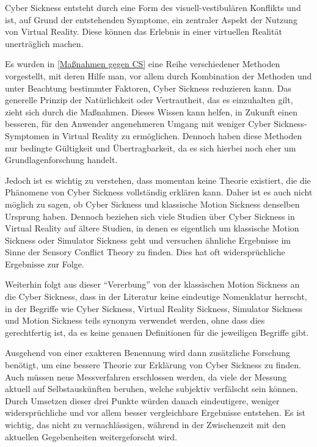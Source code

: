 Cyber Sickness entsteht durch eine Form des visuell-vestibul\"aren Konflikts und ist, auf Grund der entstehenden Symptome, ein zentraler Aspekt der Nutzung von Virtual Reality. Diese k\"onnen das Erlebnis in einer virtuellen Realit\"at unertr\"aglich machen.

Es wurden in \autoref{Maßnahmen gegen CS} eine Reihe verschiedener Methoden vorgestellt, mit deren Hilfe man, vor allem durch Kombination der Methoden und unter Beachtung bestimmter Faktoren, Cyber Sickness reduzieren kann. Das generelle Prinzip der Nat\"urlichkeit oder Vertrautheit, das es einzuhalten gilt, zieht sich durch die Ma{\ss}nahmen.
Dieses Wissen kann helfen, in Zukunft einen besseren, f\"ur den Anwender angenehmeren Umgang mit weniger Cyber Sickness-Symptomen in Virtual Reality zu erm\"oglichen. Dennoch haben diese Methoden nur bedingte G\"ultigkeit und \"Ubertragbarkeit, da es sich hierbei noch eher um Grundlagenforschung handelt.

Jedoch ist es wichtig zu verstehen, dass momentan keine Theorie existiert, die die Ph\"anomene von Cyber Sickness vollst\"andig erkl\"aren kann. Daher ist es auch nicht m\"oglich zu sagen, ob Cyber Sickness und klassische Motion Sickness denselben Ursprung haben. Dennoch beziehen sich viele Studien \"uber Cyber Sickness in Virtual Reality auf \"altere Studien, in denen es eigentlich um klassische Motion Sickness oder Simulator Sickness geht und versuchen \"ahnliche Ergebnisse im Sinne der Sensory Conflict Theory zu finden. Dies hat oft widerspr\"uchliche Ergebnisse zur Folge.


Weiterhin folgt aus dieser "`Vererbung"' von der klassischen Motion Sickness an die Cyber Sickness, dass in der Literatur keine eindeutige Nomenklatur herrscht, in der Begriffe wie Cyber Sickness, Virtual Reality Sickness, Simulator Sickness und Motion Sickness teils synonym verwendet werden, ohne dass dies gerechtfertig ist, da es keine genauen Definitionen f\"ur die jeweiligen Begriffe gibt.

Ausgehend von einer exakteren Benennung wird dann zus\"atzliche Forschung ben\"otigt, um eine bessere Theorie zur Erkl\"arung von Cyber Sickness zu finden. Auch m\"ussen neue Messverfahren erschlossen werden, da viele der Messung aktuell auf Selbstausk\"unften beruhen, welche subjektiv verf\"alscht sein k\"onnen. Durch Umsetzen dieser drei Punkte w\"urden danach eindeutigere, weniger widerspr\"uchliche und vor allem besser vergleichbare Ergebnisse entstehen. Es ist wichtig, das nicht zu vernachl\"assigen, w\"ahrend in der Zwischenzeit mit den aktuellen Gegebenheiten weitergeforscht wird.

